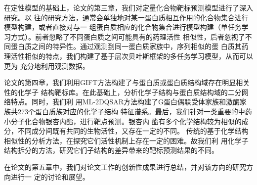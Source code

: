 在定性模型的基础上，论文的第三章，我们对定量化合物靶标预测模型进行了深入研究。以
往的研究方法，通常会单独地对某一蛋白质相互作用的化合物集合进行模型构建，或者直接对与一
组蛋白质相应的化合物集合进行模型构建（单任务学习方式）。前者忽略了不同蛋白质之间可能具有的药理活性
相似性，后者忽视了不同蛋白质之间的特异性。通过观测到同一蛋白质家族中，序列相似的蛋
白质其药理活性相似的特点，我们构建了基于层次贝叶斯框架的多任务学习模型，从而可以更为
充分地利用观测数据。

论文的第四章，我们利用GIFT方法构建了与蛋白质或蛋白质结构域存在明显相关性的化学子
结构靶标库。在此基础上，分析化学子结构与蛋白质结构域的二分网络特点。同时，我们利
用ML-2DQSAR方法构建了G蛋白偶联受体家族和激酶家族共273个蛋白质族对应的化学子结构
特征谱系。最后，我们针对一类重要的中药小分子化合物银杏内酯，进行靶点预测。银杏内
酯有多个化学结构较为相似的成分，不同成分间既有共同的生物活性，又存在一定的不同。
传统的基于化学结构相似性的分析方法，在探究它们活性机制上存在一定的困难。故我们利
用化学子结构拆分的方法，研究它们子结构的差异带来的靶标预测结果的不同。

在论文的第五章中，我们对论文工作的创新性成果进行总结，并对该方向的研究方向进行一
定的讨论和展望。